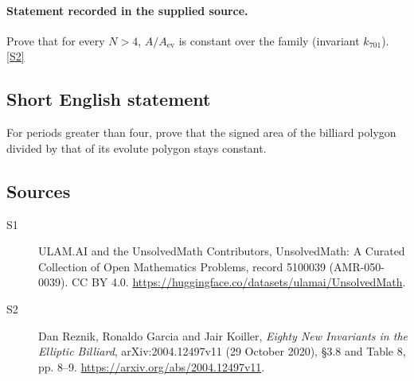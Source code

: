 \documentclass[11pt]{article}
\newcommand{\sref}[2]{\hyperlink{source:#1:#2}{[S#2]}}
\begin{document}
\paragraph{Statement recorded in the supplied source.}
Prove that for every $N>4$, $A/A_{\mathrm{ev}}$ is constant over the family (invariant $k_{701}$). \sref{5100039}{2}
\subsection{Short English statement}
For periods greater than four, prove that the signed area of the billiard polygon divided by that of its evolute polygon stays constant.
\subsection{Sources}
\begin{description}
\item[\hypertarget{source:5100039:1}{S1}] ULAM.AI and the UnsolvedMath Contributors, UnsolvedMath: A Curated Collection of Open Mathematics Problems, record 5100039 (AMR-050-0039). CC BY 4.0. \url{https://huggingface.co/datasets/ulamai/UnsolvedMath}.
\item[\hypertarget{source:5100039:2}{S2}] Dan Reznik, Ronaldo Garcia and Jair Koiller, \emph{Eighty New Invariants in the Elliptic Billiard}, arXiv:2004.12497v11 (29 October 2020), \S3.8 and Table 8, pp. 8--9. \url{https://arxiv.org/abs/2004.12497v11}.
\end{description}
\label{end:5100039}
\end{document}
